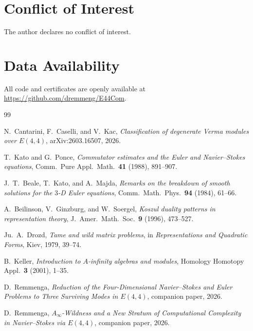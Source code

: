 \documentclass[reqno,10pt]{amsart}
\theoremstyle{plain}
\theoremstyle{definition}
\begin{document}
\section*{Conflict of Interest}
The author declares no conflict of interest.

\section*{Data Availability}
All code and certificates are openly available at
\url{https://github.com/dremmeng/E44Com}.

\begin{thebibliography}{99}

N.~Cantarini, F.~Caselli, and V.~Kac,
\emph{Classification of degenerate Verma modules over $E(4,4)$},
arXiv:2603.16507, 2026.

T.~Kato and G.~Ponce,
\emph{Commutator estimates and the Euler and Navier--Stokes equations},
Comm.\ Pure Appl.\ Math.\ \textbf{41} (1988), 891--907.

J.~T.~Beale, T.~Kato, and A.~Majda,
\emph{Remarks on the breakdown of smooth solutions for the $3$-D Euler equations},
Comm.\ Math.\ Phys.\ \textbf{94} (1984), 61--66.

A.~Beilinson, V.~Ginzburg, and W.~Soergel,
\emph{Koszul duality patterns in representation theory},
J.\ Amer.\ Math.\ Soc.\ \textbf{9} (1996), 473--527.

Ju.~A.~Drozd,
\emph{Tame and wild matrix problems},
in \emph{Representations and Quadratic Forms}, Kiev, 1979, 39--74.

B.~Keller,
\emph{Introduction to $A$-infinity algebras and modules},
Homology Homotopy Appl.\ \textbf{3} (2001), 1--35.

D.~Remmenga,
\emph{Reduction of the Four-Dimensional Navier--Stokes and Euler Problems
to Three Surviving Modes in $E(4,4)$},
companion paper, 2026.

D.~Remmenga,
\emph{$A_\infty$-Wildness and a New Stratum of Computational Complexity
in Navier--Stokes via $E(4,4)$},
companion paper, 2026.

\end{thebibliography}
\end{document}
